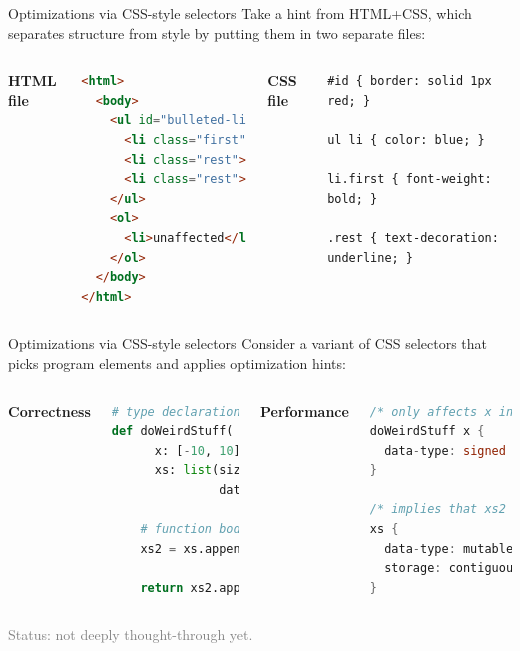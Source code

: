 \documentclass{beamer}
\begin{document}
\begin{frame}[fragile]{Optimizations via CSS-style selectors}
\vfill
Take a hint from HTML+CSS, which separates structure from style by putting them in two separate files:

\vspace{0.25 cm}
\begin{columns}[T]
{\bf \small HTML file}

\begin{lstlisting}[language=html, basicstyle=\ttfamily\scriptsize]
<html>
  <body>
    <ul id="bulleted-list">
      <li class="first">one</li>
      <li class="rest">two</li>
      <li class="rest">three</li>
    </ul>
    <ol>
      <li>unaffected</li>
    </ol>
  </body>
</html>
\end{lstlisting}

{\bf \small CSS file}

\begin{lstlisting}[basicstyle=\ttfamily\scriptsize]
#id { border: solid 1px red; }

ul li { color: blue; }

li.first { font-weight: bold; }

.rest { text-decoration: underline; }
\end{lstlisting}
\end{columns}
\end{frame}

\begin{frame}[fragile]{Optimizations via CSS-style selectors}
\vfill
Consider a variant of CSS selectors that picks program elements and applies optimization hints:

\vspace{0.25 cm}
\begin{columns}[T]
{\bf \small Correctness}

\begin{lstlisting}[language=python, basicstyle=\ttfamily\scriptsize]
# type declarations as Python3 argument decorations
def doWeirdStuff(
      x: [-10, 10],
      xs: list(size=[1, inf],
               data=[-5, 5])):

    # function body
    xs2 = xs.appended(xs[0])

    return xs2.appended(x / 2)
\end{lstlisting}

{\bf \small Performance}

\begin{lstlisting}[language=c, basicstyle=\ttfamily\scriptsize]
/* only affects x in doWeirdStuff, not other functions */
doWeirdStuff x {
  data-type: signed char;
}

/* implies that xs2 is also a mutable linked list */
xs {
  data-type: mutable linked list;
  storage: contiguous obstack;
}
\end{lstlisting}
\end{columns}

\vfill
\hfill \textcolor{gray}{Status: not deeply thought-through yet.}
\end{frame}
\end{document}
